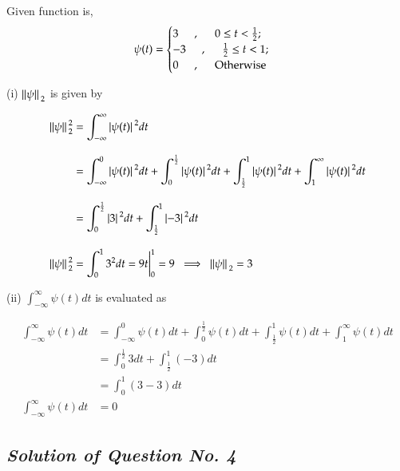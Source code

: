 \documentclass[12pt, a4paper]{article} %
\begin{document}
Given function is,\[\psi(t) = \begin{cases}
    3 \hspace*{0.5cm}, \hspace*{0.5cm} 0\leq t < \frac{1}{2}; &\\
    -3 \hspace*{0.5cm}, \hspace*{0.5cm} \frac{1}{2}\leq t < 1; &\\
    0 \hspace*{0.5cm}, \hspace*{0.5cm} \mbox{Otherwise}
\end{cases}\]

(i) $\norm*{\psi}_2$ is given by

\begin{equation*}
    \begin{split}
        \norm*{\psi}_2^2 & = \int_{-\infty}^{\infty} \abs*{\psi(t)}^2 dt\\[3mm]
        & = \int_{-\infty}^{0} \abs*{\psi(t)}^2 dt + \int_{0}^{\frac{1}{2}} \abs*{\psi(t)}^2 dt + \int_{\frac{1}{2}}^{1} \abs*{\psi(t)}^2 dt + \int_{1}^{\infty} \abs*{\psi(t)}^2 dt\\[3mm]
        & = \int_{0}^{\frac{1}{2}} \abs*{3}^2 dt + \int_{\frac{1}{2}}^{1} \abs*{-3}^2 dt\\[3mm]
        \norm*{\psi}_2^2 & = \int_{0}^{1} 3^2 dt = 9t\bigg|_0^1 = 9\ \implies\ \norm*{\psi}_2  =  3
    \end{split}
\end{equation*}

(ii) $\displaystyle \int_{-\infty}^{\infty}\psi(t)dt$ is evaluated as

\begin{equation*}
    \begin{split}
        \int_{-\infty}^{\infty}\psi(t)dt & = \int_{-\infty}^{0}\psi(t)dt + \int_{0}^{\frac{1}{2}}\psi(t)dt + \int_{\frac{1}{2}}^{1}\psi(t)dt + \int_{1}^{\infty}\psi(t)dt\\[3mm]
        & = \int_{0}^{\frac{1}{2}}3dt + \int_{\frac{1}{2}}^{1}(-3)dt\\[3mm]
        & = \int_{0}^{1}(3-3)dt\\[3mm]
        \int_{-\infty}^{\infty}\psi(t)dt & = 0
    \end{split}
\end{equation*}

\BgThispage
\subsection{\slshape Solution of Question No. 4}
\end{document}
